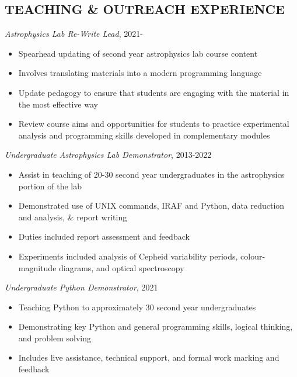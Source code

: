 \documentclass[letter, margin, 10pt]{res} %
\begin{document}
\begin{resume}
 \vspace{-6pt}
\section{TEACHING \& OUTREACH EXPERIENCE}

{\sl Astrophysics Lab Re-Write Lead}, 2021-
\begin{itemize}[noitemsep,topsep=0pt,parsep=0pt,partopsep=0pt]
\item Spearhead updating of second year astrophysics lab course content
\item Involves translating materials into a modern programming language
\item Update pedagogy to ensure that students are engaging with the material in the most effective way
\item Review course aims and opportunities for students to practice experimental analysis and programming skills developed in complementary modules
\end{itemize}

\vspace{-10pt}

{\sl Undergraduate Astrophysics Lab Demonstrator}, 2013-2022
\begin{itemize}[noitemsep,topsep=0pt,parsep=0pt,partopsep=0pt]
\item Assist in teaching of 20-30 second year undergraduates in the astrophysics portion of the lab
\item Demonstrated use of UNIX commands, IRAF and Python, data reduction and analysis, \& report writing
\item Duties included report assessment and feedback
\item Experiments included analysis of Cepheid variability periods, colour-magnitude diagrams, and optical spectroscopy
\end{itemize}

\vspace{-10pt}

{\sl Undergraduate Python Demonstrator}, 2021
\begin{itemize}[noitemsep,topsep=0pt,parsep=0pt,partopsep=0pt]
\item Teaching Python to approximately 30 second year undergraduates
\item Demonstrating key Python and general programming skills, logical thinking, and problem solving
\item Includes live assistance, technical support, and formal work marking and feedback
\end{itemize}


\end{resume}
\end{document}
